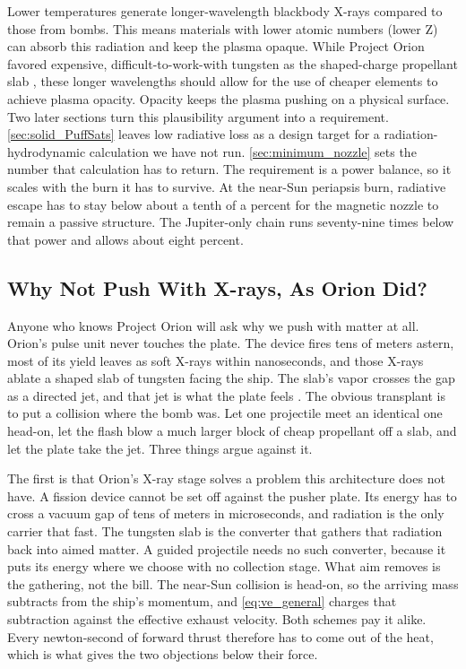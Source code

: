 \documentclass{article}
\begin{document}
Lower temperatures generate longer-wavelength blackbody X-rays compared to those from bombs. This means materials with lower atomic numbers (lower Z) can absorb this radiation and keep the plasma opaque. While Project Orion favored expensive, difficult-to-work-with tungsten as the shaped-charge propellant slab \cite{balcomb1970nuclear, dyson2002project_orion}, these longer wavelengths should allow for the use of cheaper elements to achieve plasma opacity. Opacity keeps the plasma pushing on a physical surface. Two later sections turn this plausibility argument into a requirement. \autoref{sec:solid_PuffSats} leaves low radiative loss as a design target for a radiation-hydrodynamic calculation we have not run. \autoref{sec:minimum_nozzle} sets the number that calculation has to return. The requirement is a power balance, so it scales with the burn it has to survive. At the near-Sun periapsis burn, radiative escape has to stay below about a tenth of a percent for the magnetic nozzle to remain a passive structure. The Jupiter-only chain runs seventy-nine times below that power and allows about eight percent.


\subsection{Why Not Push With X-rays, As Orion Did?}\label{sec:why_not_xray_drive}
Anyone who knows Project Orion will ask why we push with matter at all. Orion's pulse unit never touches the plate. The device fires tens of meters astern, most of its yield leaves as soft X-rays within nanoseconds, and those X-rays ablate a shaped slab of tungsten facing the ship. The slab's vapor crosses the gap as a directed jet, and that jet is what the plate feels \cite{balcomb1970nuclear, dyson2002project_orion}. The obvious transplant is to put a collision where the bomb was. Let one projectile meet an identical one head-on, let the flash blow a much larger block of cheap propellant off a slab, and let the plate take the jet. Three things argue against it.

The first is that Orion's X-ray stage solves a problem this architecture does not have. A fission device cannot be set off against the pusher plate. Its energy has to cross a vacuum gap of tens of meters in microseconds, and radiation is the only carrier that fast. The tungsten slab is the converter that gathers that radiation back into aimed matter. A guided projectile needs no such converter, because it puts its energy where we choose with no collection stage. What aim removes is the gathering, not the bill. The near-Sun collision is head-on, so the arriving mass subtracts from the ship's momentum, and \autoref{eq:ve_general} charges that subtraction against the effective exhaust velocity. Both schemes pay it alike. Every newton-second of forward thrust therefore has to come out of the heat, which is what gives the two objections below their force.
\end{document}
